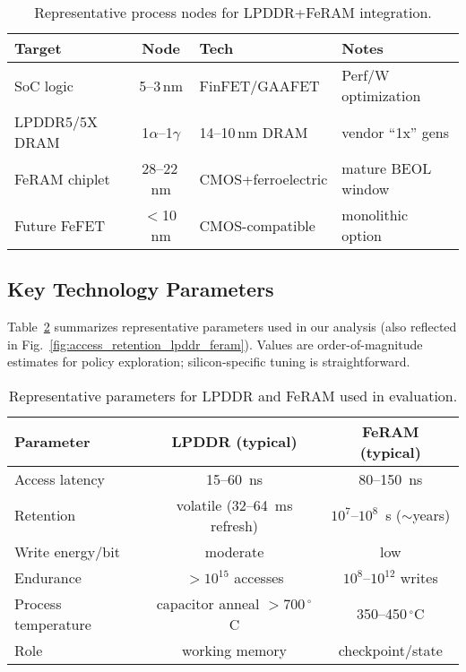 \begin{table}[t]
  \centering
  \caption{Representative process nodes for LPDDR+FeRAM integration.}
  \label{tab:node_mapping}
  \vspace{2pt}
  \small
  \setlength{\tabcolsep}{5pt}
  \begin{tabular}{@{}lcll@{}}
    \toprule
    \textbf{Target} & \textbf{Node} & \textbf{Tech} & \textbf{Notes} \\
    \midrule
    SoC logic & 5--3\,nm & FinFET/GAAFET & Perf/W optimization \\
    LPDDR5/5X DRAM & 1$\alpha$--1$\gamma$ & 14--10\,nm DRAM & vendor “1x” gens \\
    FeRAM chiplet & 28--22\,nm & CMOS+ferroelectric & mature BEOL window \\
    Future FeFET & $<$10\,nm & CMOS-compatible & monolithic option \\
    \bottomrule
  \end{tabular}
\end{table}

\subsection{Key Technology Parameters}
Table~\ref{tab:tech_params} summarizes representative parameters used in our analysis (also reflected in Fig.~\ref{fig:access_retention_lpddr_feram}).
Values are order-of-magnitude estimates for policy exploration; silicon-specific tuning is straightforward.

\begin{table}[t]
  \centering
  \caption{Representative parameters for LPDDR and FeRAM used in evaluation.}
  \label{tab:tech_params}
  \vspace{2pt}
  \small
  \setlength{\tabcolsep}{5pt}
  \begin{tabular}{@{}lcc@{}}
    \toprule
    Parameter & LPDDR (typical) & FeRAM (typical) \\
    \midrule
    Access latency & 15--60~ns & 80--150~ns \\
    Retention & volatile (32--64~ms refresh) & $10^7$--$10^8$~s ($\sim$years) \\
    Write energy/bit & moderate & low \\
    Endurance & $>10^{15}$ accesses & $10^8$--$10^{12}$ writes \\
    Process temperature & capacitor anneal $>700\,^\circ$C & 350--450$\,^\circ$C \\
    Role & working memory & checkpoint/state \\
    \bottomrule
  \end{tabular}
\end{table}
